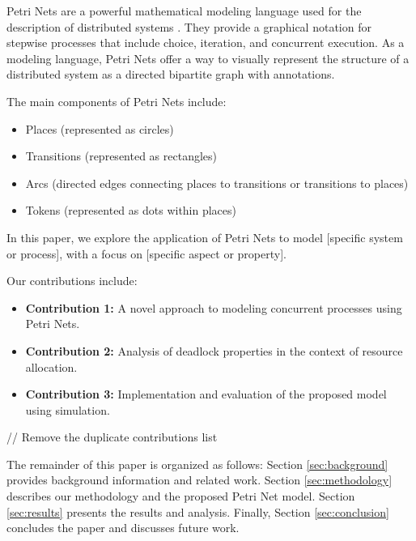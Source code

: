 
Petri Nets are a powerful mathematical modeling language used for the description of distributed systems \cite{murata1989petri}. They provide a graphical notation for stepwise processes that include choice, iteration, and concurrent execution. As a modeling language, Petri Nets offer a way to visually represent the structure of a distributed system as a directed bipartite graph with annotations.

The main components of Petri Nets include:
\begin{itemize}
    \item Places (represented as circles)
    \item Transitions (represented as rectangles)
    \item Arcs (directed edges connecting places to transitions or transitions to places)
    \item Tokens (represented as dots within places)
\end{itemize}

In this paper, we explore the application of Petri Nets to model [specific system or process], with a focus on [specific aspect or property]. %

Our contributions include:
\begin{itemize}[leftmargin=*,align=left]
    \item \textbf{Contribution 1:} A novel approach to modeling concurrent processes using Petri Nets.
    \item \textbf{Contribution 2:} Analysis of deadlock properties in the context of resource allocation.
    \item \textbf{Contribution 3:} Implementation and evaluation of the proposed model using simulation.
\end{itemize}

// Remove the duplicate contributions list

The remainder of this paper is organized as follows: Section \ref{sec:background} provides background information and related work. Section \ref{sec:methodology} describes our methodology and the proposed Petri Net model. Section \ref{sec:results} presents the results and analysis. Finally, Section \ref{sec:conclusion} concludes the paper and discusses future work.